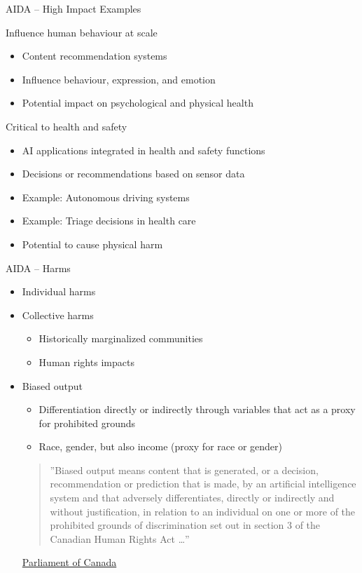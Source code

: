 \documentclass[ignorenonframetext,xcolor=x11names]{beamer}
\begin{document}
\begin{frame}[label=advanced]{AIDA -- High Impact Examples}
  \begin{block}{Influence human behaviour at scale}
  \begin{itemize}
     \item Content recommendation systems
     \item Influence behaviour, expression, and emotion
     \item Potential impact on psychological and physical health
  \end{itemize}
  \end{block}
  
  \begin{block}{Critical to health and safety}
  \begin{itemize}
     \item AI applications integrated in health and safety functions
     \item Decisions or recommendations based on sensor data
     \item Example: Autonomous driving systems
     \item Example: Triage decisions in health care
     \item Potential to cause physical harm
  \end{itemize}
  \end{block}
\end{frame}

\begin{frame}[label=advanced]{AIDA -- Harms}
\begin{itemize}
  \item Individual harms
  \item Collective harms 
  \begin{itemize}
     \item Historically marginalized communities
     \item Human rights impacts
  \end{itemize}
  \item Biased output
  \begin{itemize}
     \item Differentiation directly or indirectly through variables that act as a proxy for prohibited grounds
     \item Race, gender, but also income (proxy for race or gender)
  \end{itemize}
  
  \vspace{\baselineskip}
  \begin{quote}''Biased output means content that is generated, or a decision, recommendation or prediction that is made, by an artificial intelligence system and that adversely differentiates, directly or indirectly and without justification, in relation to an individual on one or more of the prohibited grounds of discrimination set out in section 3 of the Canadian Human Rights Act \ldots''\end{quote}  \scriptsize \href{https://www.parl.ca/legisinfo/en/bill/44-1/c-27}{Parliament of Canada}
\end{itemize}
\end{frame}
\end{document}
